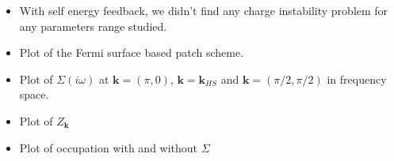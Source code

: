 \begin{itemize}

\item With self energy feedback, we didn't find any charge instability problem for any parameters range studied.

\item Plot of the Fermi surface based patch scheme.

\item Plot of $\Sigma(i\omega)$ at $\boldsymbol{k}=(\pi,0)$, $\boldsymbol{k}=\boldsymbol{k}_{HS}$ and $\boldsymbol{k}=(\pi/2,\pi/2)$ in frequency space.

\item Plot of $Z_{\boldsymbol{k}}$

\item Plot of occupation with and without $\Sigma$

\end{itemize}
